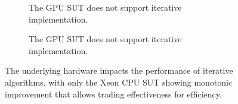 \begin{landscape}
\begin{figure}[htbp]
\begin{minipage}[b]{0.4\textwidth}
\begin{subfigure}[b]{\textwidth}
                \centering
                
                \vspace{.25em}
                \caption{The \acs{GPU} \acs{SUT} does not support iterative implementation.}
                \vspace{.25em}
                \label{Figure:gpu-nmi}
            \end{subfigure}
            \begin{subfigure}[b]{\textwidth}
                \centering
                \vspace{2em}
                
                \vspace{.25em}
                \caption{The \acs{GPU} \acs{SUT} does not support iterative implementation.}
                \label{Figure:gpu-nc}
            \end{subfigure}
            \vspace{.25em}
        \end{minipage}

        \caption{The underlying hardware impacts the performance of iterative algorithms, with only the Xeon \acs{CPU} \acs{SUT} showing monotonic improvement that allows trading effectiveness for efficiency.}
        \label{Figure:monotonics}
    
    \end{figure}

\end{landscape}